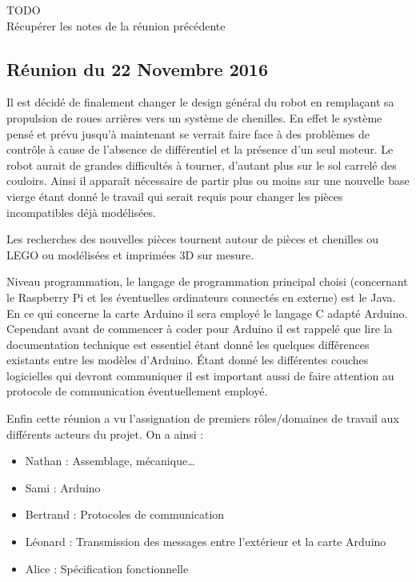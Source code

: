 \documentclass{article}
\begin{document}
        TODO\\
        Récupérer les notes de la réunion précédente
        
    \subsection{Réunion du 22 Novembre 2016}

        Il est décidé de finalement changer le design général du robot en remplaçant sa propulsion de roues arrières vers un système de chenilles. En effet le système pensé et prévu jusqu'à maintenant se verrait faire face à des problèmes de contrôle à cause de l'absence de différentiel et la présence d'un seul moteur. Le robot aurait de grandes difficultés à tourner, d'autant plus sur le sol carrelé des couloirs. Ainsi il apparaît nécessaire de partir plus ou moins sur une nouvelle base vierge étant donné le travail qui serait requis pour changer les pièces incompatibles déjà modélisées.
        \newline
        
        Les recherches des nouvelles pièces tournent autour de pièces et chenilles ou LEGO ou modélisées et imprimées 3D sur mesure.
        \newline
        
        Niveau programmation, le langage de programmation principal choisi (concernant le Raspberry Pi et les éventuelles ordinateurs connectés en externe) est le Java. En ce qui concerne la carte Arduino il sera employé le langage C adapté Arduino.\\
        Cependant avant de commencer à coder pour Arduino il est rappelé que lire la documentation technique est essentiel étant donné les quelques différences existants entre les modèles d'Arduino. Étant donné les différentes couches logicielles qui devront communiquer il est important aussi de faire attention au protocole de communication éventuellement employé.
        \newline
        
        Enfin cette réunion a vu l'assignation de premiers rôles/domaines de travail aux différents acteurs du projet. On a ainsi :
        \begin{itemize}
            \item Nathan  : Assemblage, mécanique\dots
            \item Sami  : Arduino
            \item Bertrand  : Protocoles de communication
            \item Léonard  : Transmission des messages entre l'extérieur et la carte Arduino
            \item Alice  : Spécification fonctionnelle
        \end{itemize}
\end{document}
